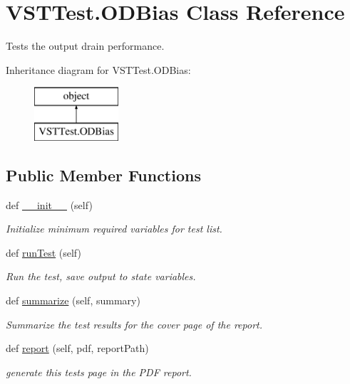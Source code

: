 \hypertarget{class_v_s_t_test_1_1_o_d_bias}{}\section{V\+S\+T\+Test.\+O\+D\+Bias Class Reference}
\label{class_v_s_t_test_1_1_o_d_bias}


Tests the output drain performance.  


Inheritance diagram for V\+S\+T\+Test.\+O\+D\+Bias\+:\begin{figure}[H]
\begin{center}
\leavevmode
\includegraphics[height=2.000000cm]{class_v_s_t_test_1_1_o_d_bias}
\end{center}
\end{figure}
\subsection*{Public Member Functions}
\begin{DoxyCompactItemize}
\item 
def \hyperlink{class_v_s_t_test_1_1_o_d_bias_a88e2719862efb9dd56270b85f7278633}{\+\_\+\+\_\+init\+\_\+\+\_\+} (self)
\begin{DoxyCompactList}\small\item\em Initialize minimum required variables for test list. \end{DoxyCompactList}\item 
def \hyperlink{class_v_s_t_test_1_1_o_d_bias_af4171c62c482cb405b7a9f041b77b0a7}{run\+Test} (self)
\begin{DoxyCompactList}\small\item\em Run the test, save output to state variables. \end{DoxyCompactList}\item 
def \hyperlink{class_v_s_t_test_1_1_o_d_bias_a3c03e2c6ef520bbb3e816840c938d4a4}{summarize} (self, summary)
\begin{DoxyCompactList}\small\item\em Summarize the test results for the cover page of the report. \end{DoxyCompactList}\item 
def \hyperlink{class_v_s_t_test_1_1_o_d_bias_a6d831d4a581a1ec2964dcf36e2f68f61}{report} (self, pdf, report\+Path)
\begin{DoxyCompactList}\small\item\em generate this test\textquotesingle{}s page in the P\+DF report. \end{DoxyCompactList}\end{DoxyCompactItemize}


